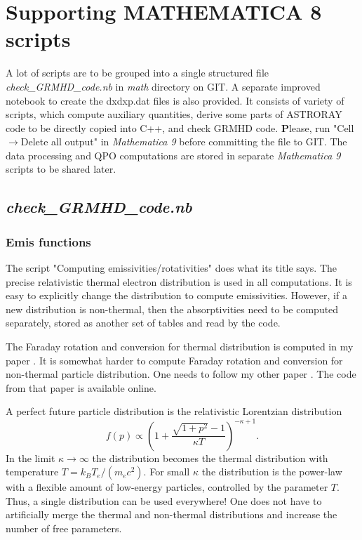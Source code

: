 \documentclass{emulateapj}
\newcommand{\mat}{\textit{Mathematica 9 }}
\begin{document}
\section{Supporting MATHEMATICA 8 scripts}
A lot of scripts are to be grouped into a single structured file
\textit{check\_GRMHD\_code.nb} in \textit{math} directory on GIT. A
separate improved notebook to create the dxdxp.dat files is also
provided. It consists of variety of scripts, which compute auxiliary
quantities, derive some parts of ASTRORAY code to be directly copied
into C++, and check GRMHD code.  {\textbf Please, run
  "Cell$\rightarrow$Delete all output" in \mat before committing the
  file to GIT.}  The data processing and QPO computations are stored
in separate \mat scripts to be shared later.
\subsection{\textit{check\_GRMHD\_code.nb}}
\subsubsection{Emis functions}
The script "Computing emissivities/rotativities" does what its title
says. The precise relativistic thermal electron distribution is used
in all computations.  It is easy to explicitly change the distribution
to compute emissivities. However, if a new distribution is
non-thermal, then the absorptivities need to be computed separately,
stored as another set of tables and read by the code.

The Faraday rotation and conversion for thermal distribution is
computed in my paper \citep{Shcherbakov:2008fa}.  It is somewhat
harder to compute Faraday rotation and conversion for non-thermal
particle distribution.  One needs to follow my other paper
\citet{Huang:2011de}. The code from that paper is available online.

A perfect future particle distribution is the relativistic Lorentzian
distribution \citep{Shcherbakov:2009po}
\begin{equation}
f(p)\propto\left(1+\frac{\sqrt{1+p^2}-1}{\kappa T}\right)^{-\kappa+1}.
\end{equation} 
In the limit $\kappa\rightarrow\infty$ the distribution becomes the
thermal distribution with temperature $T=k_B T_e/(m_e c^2)$.  For
small $\kappa$ the distribution is the power-law with a flexible
amount of low-energy particles, controlled by the parameter $T$.
Thus, a single distribution can be used everywhere! One does not have
to artificially merge the thermal and non-thermal distributions and
increase the number of free parameters.
\end{document}
